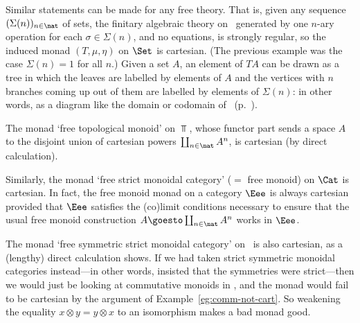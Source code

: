 \begin{example}%
%
%
Similar statements can be made for any free theory.  That is, given any
sequence $(\Sigma(n))_{n\in \nat}$ of sets, the finitary algebraic theory
on \Set\ generated by one $n$-ary operation for each $\sigma \in
\Sigma(n)$, and no equations, is strongly regular, so the induced monad
$(T,\mu,\eta)$ on $\Set$ is cartesian.  (The previous example was the case
$\Sigma(n)=1$ for all $n$.)  Given a set $A$, an element of $TA$ can be
drawn as a tree%
%
%
in which the leaves are labelled by elements of $A$ and the
vertices with $n$ branches coming up out of them are labelled by elements
of $\Sigma(n)$: in other words, as a diagram like the domain or codomain
of~ (p.~\pageref{eq:Sigma-mon-cat-iso}).%
%
%
%
%
\end{example}

\begin{example}		%
%
%
The monad `free topological monoid' on $\Top$, whose functor part sends a
space $A$ to the disjoint union of cartesian powers
$\coprod_{n\in\nat}A^n$, is cartesian (by direct calculation).
\end{example}

\begin{example}		%
%
%
Similarly, the monad `free strict monoidal category' ($=$ free
monoid) on $\Cat$ is cartesian.  In fact, the free monoid monad on a
category $\Eee$ is always cartesian provided that $\Eee$ satisfies the
(co)limit conditions necessary to ensure that the usual free monoid
construction $A \goesto \coprod_{n\in\nat}A^n$ works in $\Eee$.
\end{example}

\begin{example}		%
%
%
The monad `free symmetric strict monoidal category' on \Cat\ is also
cartesian, as a (lengthy) direct calculation shows.  If we had taken strict
symmetric monoidal categories instead---in other words, insisted that the
symmetries were strict---then we would just be looking at commutative
monoids in \Cat, and the monad would fail to be cartesian by the argument
of Example~\ref{eg:comm-not-cart}.  So weakening%
%
%
%
%
the equality $x \otimes y
= y\otimes x$ to an isomorphism makes a bad monad good.
\end{example}

